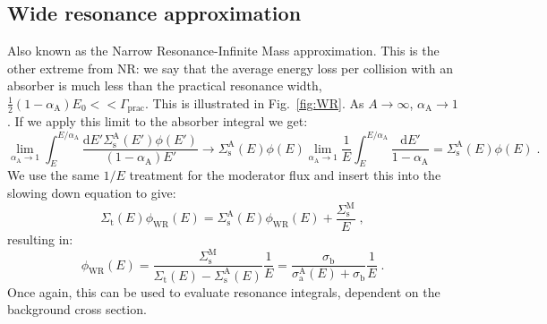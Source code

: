 \subsection{Wide resonance approximation}

Also known as the Narrow Resonance-Infinite Mass approximation. This is the other extreme from NR: we say that the average energy loss per collision with an absorber is much less than the practical resonance width, $\frac{1}{2}(1-\alpha_\mathrm{A})E_0 << \Gamma_\mathrm{prac}$. This is illustrated in Fig.~\ref{fig:WR}. As $A\rightarrow\infty$, $\alpha_\mathrm{A}\rightarrow 1$. If we apply this limit to the absorber integral we get:
\begin{equation*}
    \lim_{\alpha_\mathrm{A}\rightarrow 1}\int^{E/\alpha_\mathrm{A}}_E\frac{\mathrm{d}E' \Sigma^\mathrm{A}_\mathrm{s}(E')\phi(E')}{(1-\alpha_\mathrm{A})E'}\rightarrow \Sigma^\mathrm{A}_\mathrm{s}(E)\phi(E)\lim_{\alpha_\mathrm{A}\rightarrow 1} \frac{1}{E}\int^{E/\alpha_\mathrm{A}}_E\frac{\mathrm{d}E'}{1-\alpha_\mathrm{A}} = \Sigma^\mathrm{A}_\mathrm{s}(E)\phi(E)\;\mathrm{.}
\end{equation*}
We use the same $1/E$ treatment for the moderator flux and insert this into the slowing down equation to give:
\begin{equation*}
    \Sigma_\mathrm{t}(E)\phi_\mathrm{WR}(E) = \Sigma^\mathrm{A}_\mathrm{s}(E)\phi_\mathrm{WR}(E) + \frac{\Sigma^\mathrm{M}_\mathrm{s}}{E}\;\mathrm{,}
\end{equation*}
resulting in:
\begin{equation*}
    \phi_\mathrm{WR}(E) = \frac{\Sigma^\mathrm{M}_\mathrm{s}}{\Sigma_\mathrm{t}(E) - \Sigma^\mathrm{A}_\mathrm{s}(E)}\frac{1}{E} = \frac{\sigma_\mathrm{b}}{\sigma^\mathrm{A}_\mathrm{a}(E) + \sigma_\mathrm{b}}\frac{1}{E}\;\mathrm{.}
\end{equation*}
Once again, this can be used to evaluate resonance integrals, dependent on the background cross section.

